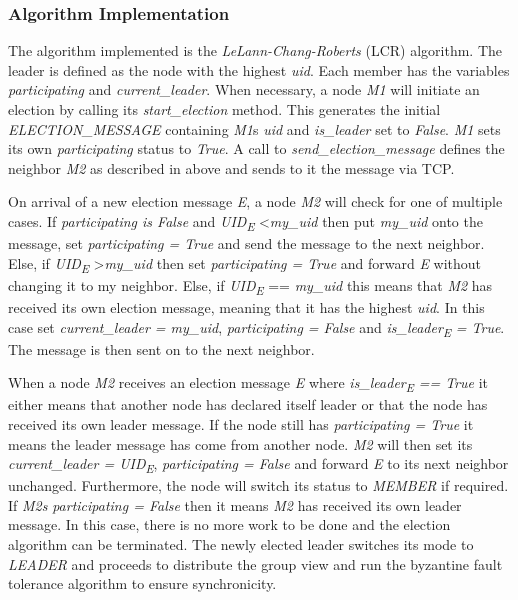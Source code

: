 \documentclass[runningheads]{llncs}
\begin{document}
\subsubsection{Algorithm Implementation}

The algorithm implemented is the \textit{LeLann-Chang-Roberts} (LCR) algorithm. The leader is defined as the node with the highest \textit{uid}. Each member has the variables \textit{participating} and \textit{current\_leader}. When necessary, a node \textit{M1} will initiate an election by calling its \textit{start\_election} method. This generates the initial \textit{ELECTION\_MESSAGE} containing \textit{M1}s \textit{uid} and \textit{is\_leader} set to \textit{False}. \textit{M1} sets its own \textit{participating} status to \textit{True}. A call to \textit{send\_election\_message} defines the neighbor \textit{M2} as described in above and sends to it the message via TCP.

On arrival of a new election message \textit{E}, a node \textit{M2} will check for one of multiple cases. If \textit{participating is False} and \textit{UID\textsubscript{E}} \textless \textit{my\_uid} then put \textit{my\_uid} onto the message, set \textit{participating = True} and send the message to the next neighbor. Else, if \textit{UID\textsubscript{E}} \textgreater \textit{my\_uid} then set \textit{participating = True} and forward \textit{E} without changing it to my neighbor. Else, if \textit{UID\textsubscript{E}} == \textit{my\_uid} this means that \textit{M2} has received its own election message, meaning that it has the highest \textit{uid}. In this case set \textit{current\_leader = my\_uid}, \textit{participating = False} and \textit{is\_leader\textsubscript{E} = True}. The message is then sent on to the next neighbor.

When a node \textit{M2} receives an election message \textit{E} where \textit{is\_leader\textsubscript{E} == True} it either means that another node has declared itself leader or that the node has received its own leader message. If the node still has \textit{participating = True} it means the leader message has come from another node. \textit{M2} will then set its \textit{current\_leader = UID\textsubscript{E}}, \textit{participating = False} and forward \textit{E} to its next neighbor unchanged. Furthermore, the node will switch its status to \textit{MEMBER} if required. If \textit{M2s} \textit{participating = False} then it means \textit{M2} has received its own leader message. In this case, there is no more work to be done and the election algorithm can be terminated. The newly elected leader switches its mode to \textit{LEADER} and proceeds to distribute the group view and run the byzantine fault tolerance algorithm to ensure synchronicity.
\end{document}
